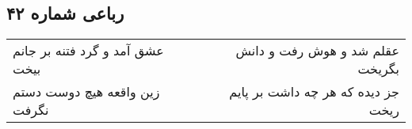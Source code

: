 \begin{center}
\section*{رباعی شماره ۴۲}
\label{sec:sh042}
\begin{longtable}{l p{0.5cm} r}
عشق آمد و گرد فتنه بر جانم بیخت
&&
عقلم شد و هوش رفت و دانش بگریخت
\\
زین واقعه هیچ دوست دستم نگرفت
&&
جز دیده که هر چه داشت بر پایم ریخت
\\
\end{longtable}
\end{center}

